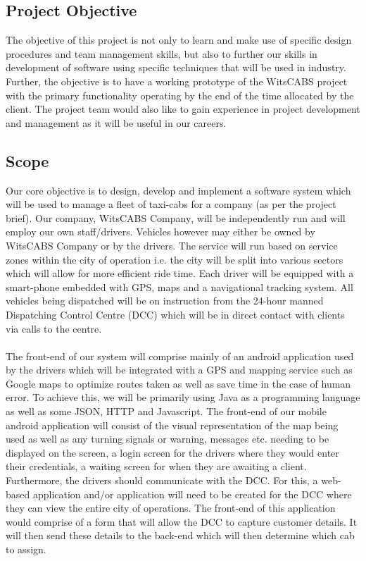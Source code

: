 \documentclass[a4paper,12pt]{article}
\begin{document}
\subsection{Project Objective}
The objective of this project is not only to learn and make use of specific design procedures and team management skills, but also to further our skills in development of software using specific techniques that will be used in industry. Further, the objective is to have a working prototype of the WitsCABS project with the primary functionality operating by the end of the time allocated by the client. The project team would also like to gain experience in project development and management as it will be useful in our careers.
\newpage
\subsection{Scope}
Our core objective is to design, develop and implement a software system which will be used to manage a fleet of taxi-cabs for a company (as per the project brief). Our company, WitsCABS Company, will be independently run and will employ our own staff/drivers. Vehicles however may either be owned by WitsCABS Company or by the drivers. The service will run based on service zones within the city of operation i.e. the city will be split into various sectors which will allow for more efficient ride time. Each driver will be equipped with a smart-phone embedded with GPS, maps and a navigational tracking system. All vehicles being dispatched will be on instruction from the 24-hour manned Dispatching Control Centre (DCC) which will be in direct contact with clients via calls to the centre.
\\\\
The front-end of our system will comprise mainly of an android application used by the drivers which will be integrated with a GPS and mapping service such as Google maps to optimize routes taken as well as save time in the case of human error. To achieve this, we will be primarily using Java as a programming language as well as some JSON, HTTP and Javascript. The front-end of our mobile android application will consist of the visual representation of the map being used as well as any turning signals or warning, messages etc. needing to be displayed on the screen, a login screen for the drivers where they would enter their credentials, a waiting screen for when they are awaiting a client. Furthermore, the drivers should communicate with the DCC. For this, a web-based application and/or application will need to be created for the DCC where they can view the entire city of operations. The front-end of this application would comprise of a form that will allow the DCC to capture customer details. It will then send these details to the back-end which will then determine which cab to assign.\\ \\
\end{document}
